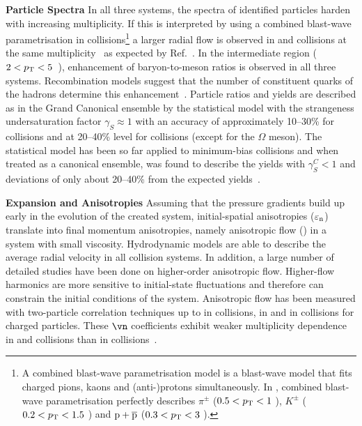 \documentclass[../report.tex]{subfiles}
\begin{document}
\textbf{Particle Spectra}
In all three systems, the \pT spectra of identified particles harden with increasing multiplicity. If this is interpreted by using a combined blast-wave parametrisation in \PbPb collisions\footnote{A combined blast-wave parametrisation model is a blast-wave model that fits charged pions, kaons and (anti-)protons simultaneously. In \cite{Abelev:2012wca}, combined blast-wave parametrisation perfectly describes $\pi^{\pm}$ ($ 0.5 < p\sb{\scriptstyle\mathrm{T}} < 1$ \UGeVc), $K^{\pm}$ ($ 0.2 < p\sb{\scriptstyle\mathrm{T}} < 1.5$ \UGeVc) and ${\rm p}+\overline{\rm{p}}$ ($ 0.3 < p\sb{\scriptstyle\mathrm{T}} < 3$ \UGeVc).} a larger radial flow is observed in \pp and \pPb collisions at the same multiplicity~\cite{Acharya:2018orn} as expected by Ref.~\cite{Shuryak:2013ke}. In the intermediate \pT region ($2 < p\sb{\scriptstyle\mathrm{T}} < 5 $~\UGeVc), enhancement of baryon-to-meson ratios is observed in all three systems. Recombination models suggest that the number of constituent quarks of the hadrons determine this enhancement~\cite{Andrei:2014vaa,Abelev:2013xaa,Abelev:2013haa,Abelev:2014uua,Khachatryan:2016yru,Adam:2015jca,Adam:2016dau,Adam:2017zbf}. Particle ratios and yields are described as in the Grand Canonical ensemble by the statistical model with the strangeness undersaturation factor $\gamma_{S}\approx 1$ with an accuracy of approximately 10--30\% for \PbPb collisions and at 20--40\% level for \pPb collisions (except for the $\Omega$ meson). The statistical model has been so far applied to minimum-bias \pp collisions and when treated as a canonical ensemble, was found to describe the yields with $\gamma^{C}_{S} < 1$ and deviations of only about 20--40\% from the expected yields~\cite{Adam:2016emw,Adam:2016bpr,Adam:2015vsf,ABELEV:2013zaa}.

\textbf{Expansion and Anisotropies}
Assuming that the pressure gradients build up early in the evolution of the created system, initial-spatial anisotropies ($\varepsilon_{\rm{n}}$) translate into final momentum anisotropies, namely anisotropic flow (\vn) in a system with small viscosity. Hydrodynamic models are able to describe the average radial velocity in all collision systems. In addition, a large number of detailed studies have been done on higher-order anisotropic flow. Higher-flow harmonics are more sensitive to initial-state fluctuations and therefore can constrain the initial conditions of the system. Anisotropic flow has been measured with two-particle correlation techniques up to \vseven in \PbPb collisions, \vfive in \pPb and \vfour in \pp collisions for charged particles. These $\vn$ coefficients exhibit weaker multiplicity dependence in \pp and \pPb collisions than in \PbPb collisions~\cite{CMS:2012qk,Abelev:2012ola,Aad:2012gla,Aamodt:2011by,Chatrchyan:2011eka,Chatrchyan:2012wg,ATLAS:2012at,Aad:2014lta,Aad:2015gqa,CMS:2015zpa,Khachatryan:2016txc,Acharya:2017ino,Adam:2016ows,Adam:2016nfo,Acharya:2018zuq,Sirunyan:2017uyl,Aaboud:2017acw}.
\end{document}
